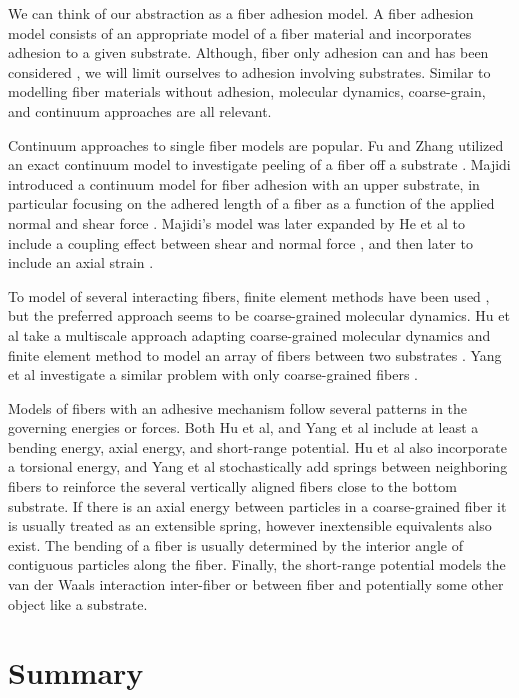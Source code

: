 	We can think of our abstraction as a fiber adhesion model. A fiber adhesion model consists of an appropriate model of a fiber material and incorporates adhesion to a given substrate. Although, fiber only adhesion can and has been considered \cite{Li2011}, we will limit ourselves to adhesion involving substrates. Similar to modelling fiber materials without adhesion, molecular dynamics, coarse-grain, and continuum approaches are all relevant. 
	
	Continuum approaches to single fiber models are popular. Fu and Zhang utilized an exact continuum model to investigate peeling of a fiber off a substrate \cite{fu2011}. Majidi introduced a continuum model for fiber adhesion with an upper substrate, in particular focusing on the adhered length of a fiber as a function of the applied normal and shear force \cite{Majidi2009}. Majidi's model was later expanded by He et al to include a coupling effect between shear and normal force \cite{He2012}, and then later to include an axial strain \cite{He2013}. 
	
	To model of several interacting fibers, finite element methods have been used \cite{Radhakrishnan2013}, but the preferred approach seems to be coarse-grained molecular dynamics. Hu et al take a multiscale approach adapting coarse-grained molecular dynamics and finite element method to model an array of fibers between two substrates \cite{Hu2010}. Yang et al investigate a similar problem with only coarse-grained fibers \cite{Yang2012}.
	
	Models of fibers with an adhesive mechanism follow several patterns in the governing energies or forces. Both Hu et al, and Yang et al include at least a bending energy, axial energy, and short-range potential. Hu et al also incorporate a torsional energy, and Yang et al stochastically add springs between neighboring fibers to reinforce the several vertically aligned fibers close to the bottom substrate. If there is an axial energy between particles in a coarse-grained fiber it is usually treated as an extensible spring, however inextensible equivalents also exist. The bending of a fiber is usually determined by the interior angle of contiguous particles along the fiber. Finally, the short-range potential models the van der Waals interaction inter-fiber or between fiber and potentially some other object like a substrate. 

	
\section{Summary}

